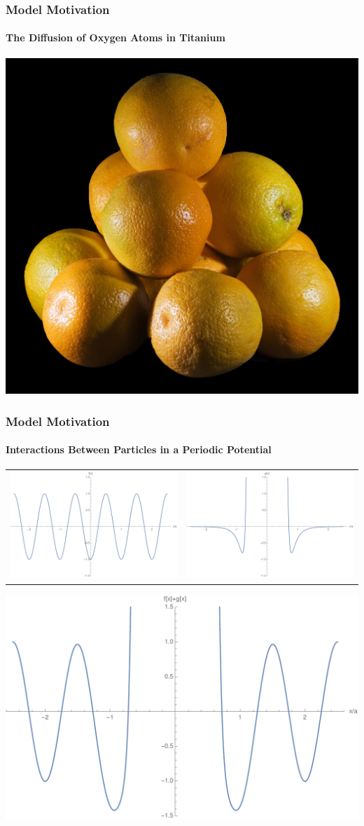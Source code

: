 \documentclass{beamer}
\begin{document}
\begin{frame}
\frametitle{Model Motivation}
\framesubtitle{The Diffusion of Oxygen Atoms in Titanium}
\begin{center}
\includegraphics[width=0.7\linewidth]{images/hcpOranges}
\end{center}
\end{frame}

\begin{frame}
\frametitle{Model Motivation}
\framesubtitle{Interactions Between Particles in a Periodic Potential}
\begin{tabular}{c c}
\includegraphics[width=0.45\linewidth]{images/fPlot} & \includegraphics[width=0.45\linewidth]{images/gPlot} \\
\end{tabular}
\begin{center}
 \includegraphics[width=0.65\linewidth]{images/fgSumPlot}
\end{center}
\end{frame}
\end{document}
